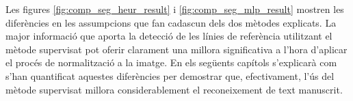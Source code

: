 Les figures \ref{fig:comp_seg_heur_result} i \ref{fig:comp_seg_mlp_result} mostren les diferències en les assumpcions que fan cadascun dels dos mètodes explicats. La major informació que aporta la detecció de les línies de referència utilitzant el mètode supervisat pot oferir clarament una millora significativa a l'hora d'aplicar el procés de normalització a la imatge. En els següents capítols s'explicarà com s'han quantificat aquestes diferències per demostrar que, efectivament, l'ús del mètode supervisat millora considerablement el reconeixement de text manuscrit.